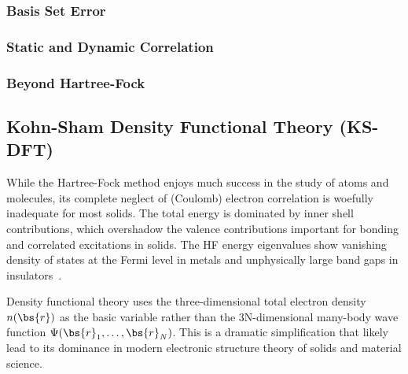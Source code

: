 \subsubsection{Basis Set Error}

\subsubsection{Static and Dynamic Correlation}

\subsubsection{Beyond Hartree-Fock}

\begin{comment}
\begin{align}
\chi_{nlm}(r, \theta, \phi;\zeta) \equiv \dfrac{(2\zeta)^{n+1/2}}{\sqrt{(2n)!}}
r^{n-1}e^{-\zeta r} Y_{lm}(\theta, \phi).
\end{align}
\begin{align}
g(r; \sigma) = \dfrac{1}{\sigma\sqrt{2\pi}} e^{-\dfrac{r^2}{2\sigma^2}}.
\end{align}
\end{comment}

\subsection{Kohn-Sham Density Functional Theory (KS-DFT)}
While the Hartree-Fock method enjoys much success in the study of atoms and molecules, its complete neglect of (Coulomb) electron correlation is woefully inadequate for most solids. The total energy is dominated by inner shell contributions, which overshadow the valence contributions important for bonding and correlated excitations in solids. The HF energy eigenvalues show vanishing density of states at the Fermi level in metals and unphysically large band gaps in insulators~\cite{Perdew1981}.

Density functional theory uses the three-dimensional total electron density $n(\bs{r})$ as the basic variable rather than the 3N-dimensional many-body wave function $\Psi(\bs{r}_1,\dots,\bs{r}_N)$. This is a dramatic simplification that likely lead to its dominance in modern electronic structure theory of solids and material science.

